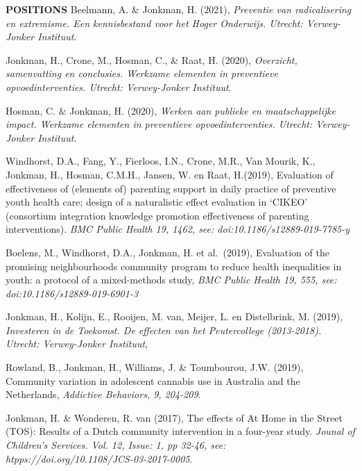 \documentclass[
  16,
]{article}
\begin{document}
\begin{large}{\bf POSITIONS}
Beelmann, A. \& Jonkman, H. (2021),
\emph{Preventie van radicalisering en extremisme. Een kennisbestand voor het Hoger Onderwijs. Utrecht: Verwey-Jonker Instituut}.

\vspace{3pt}

Jonkman, H., Crone, M., Hosman, C., \& Raat, H. (2020),
\emph{Overzicht, samenvatting en conclusies. Werkzame elementen in preventieve opvoedinterventies. Utrecht: Verwey-Jonker Instituut}.

\vspace{3pt}

Hosman, C. \& Jonkman, H. (2020),
\emph{Werken aan publieke en maatschappelijke impact. Werkzame elementen in preventieve opvoedinterventies. Utrecht: Verwey-Jonker Instituut}.

\vspace{3pt}

Windhorst, D.A., Fang, Y., Fierloos, I.N., Crone, M.R., Van Mourik, K.,
Jonkman, H., Hosman, C.M.H., Jansen, W. en Raat, H.(2019), Evaluation of
effectiveness of (elements of) parenting support in daily practice of
preventive youth health care; design of a naturalistic effect evaluation
in `CIKEO' (consortium integration knowledge promotion effectiveness of
parenting interventions).
\emph{BMC Public Health 19, 1462, see: doi:10.1186/s12889-019-7785-y}

\vspace{3pt}

Boelens, M., Windhorst, D.A., Jonkman, H. et al.~(2019), Evaluation of
the promising neighbourhoods community program to reduce health
inequalities in youth: a protocol of a mixed-methods study,
\emph{BMC Public Health 19, 555, see: doi:10.1186/s12889-019-6901-3}

\vspace{3pt}

Jonkman, H., Kolijn, E., Rooijen, M. van, Meijer, L. en Distelbrink, M.
(2019),
\emph{Investeren in de Toekomst. De effecten van het Peutercollege (2013-2018). Utrecht: Verwey-Jonker Instituut},

\vspace{3pt}

Rowland, B., Jonkman, H., Williams, J. \& Toumbourou, J.W. (2019),
Community variation in adolescent cannabis use in Australia and the
Netherlands, \emph{Addictive Behaviors, 9, 204-209}.

\vspace{3pt}

Jonkman, H. \& Wonderen, R. van (2017), The effects of At Home in the
Street (TOS): Results of a Dutch community intervention in a four-year
study.
\emph{Jounal of Children’s Services. Vol. 12, Issue: 1, pp 32-46, see: htpps://doi.org/10.1108/JCS-03-2017-0005}.


\end{large}
\end{document}
